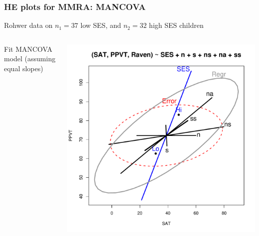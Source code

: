 \begin{frame}
  \frametitle{HE plots for MMRA: MANCOVA}
  \begin{itemize*}
	\item Rohwer data on $n_1=37$ low SES, and $n_2=32$ high SES children
  \end{itemize*}
  \begin{columns}
  	\begin{column}[T]{.4\textwidth}
	\begin{itemize*}
	  \item Fit MANCOVA model (assuming equal slopes)
	\end{itemize*}
	\end{column}
  	\begin{column}[T]{.6\textwidth}
	  \includegraphics[width=\textwidth,clip]{fig/rohwer1-1}
	\end{column}
  \end{columns}
\end{frame}

%

